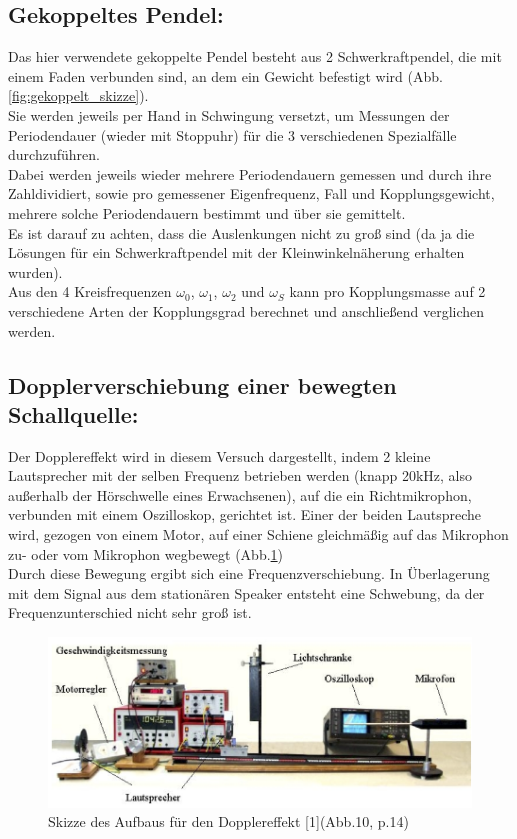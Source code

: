 \documentclass[12pt,a4paper]{article}
\begin{document}
\begin{multicols}{2}
\subsection{Gekoppeltes Pendel:}

Das hier verwendete gekoppelte Pendel besteht aus 2 Schwerkraftpendel, die mit einem Faden verbunden sind, an dem ein Gewicht befestigt wird (Abb.\ref{fig:gekoppelt_skizze}).\\

Sie werden jeweils per Hand in Schwingung versetzt, um Messungen der Periodendauer (wieder mit Stoppuhr) für die 3 verschiedenen Spezialfälle durchzuführen.\\
Dabei werden jeweils wieder mehrere Periodendauern gemessen und durch ihre Zahldividiert, sowie pro gemessener Eigenfrequenz, Fall und Kopplungsgewicht, mehrere solche Periodendauern bestimmt und über sie gemittelt.\\
Es ist darauf zu achten, dass die Auslenkungen nicht zu groß sind (da ja die Lösungen für ein Schwerkraftpendel mit der Kleinwinkelnäherung erhalten wurden).\\
Aus den 4 Kreisfrequenzen $\omega_0$, $\omega_1$, $\omega_2$ und $\omega_S$ kann pro Kopplungsmasse auf 2 verschiedene Arten der Kopplungsgrad berechnet und anschließend verglichen werden.

\subsection{Dopplerverschiebung einer bewegten Schallquelle:}

Der Dopplereffekt wird in diesem Versuch dargestellt, indem 2 kleine Lautsprecher mit der selben Frequenz betrieben werden (knapp 20kHz, also außerhalb der Hörschwelle eines Erwachsenen), auf die ein Richtmikrophon, verbunden mit einem Oszilloskop, gerichtet ist. Einer der beiden Lautspreche wird, gezogen von einem Motor, auf einer Schiene gleichmäßig auf das Mikrophon zu- oder vom Mikrophon wegbewegt (Abb.\ref{fig:dopplereffekt_skizze})\\
Durch diese Bewegung ergibt sich eine Frequenzverschiebung. In Überlagerung mit dem Signal aus dem stationären Speaker entsteht eine Schwebung, da der Frequenzunterschied nicht sehr groß ist.



\begin{figure}[H]
	\centering
	\includegraphics[scale=0.5]{./figure/dopplereffekt_skizze.png}
	\caption{Skizze des Aufbaus für den Dopplereffekt [1](Abb.10, p.14)}
	\label{fig:dopplereffekt_skizze}
\end{figure}


\end{multicols}
\end{document}

